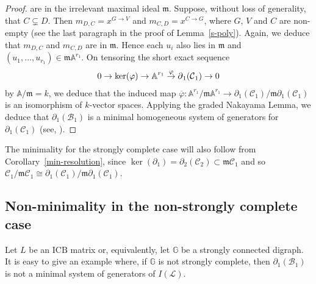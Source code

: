 \documentclass[ALCO]{cedram}
\newcommand{\mba}{\mbox{$\mathbb{A}$}}
\newcommand{\mbg}{\mbox{$\mathbb{G}$}}
\newcommand{\mcb}{\mbox{$\mathcal{B}$}}
\newcommand{\mcc}{\mbox{$\mathcal{C}$}}
\newcommand{\mcl}{\mbox{$\mathcal{L}$}}
\newcommand{\icb}{\mbox{$\mathrm{ICB}$}}
\newcommand{\mfm}{\mbox{$\mathfrak{m}$}}
\newcommand{\dif}{\mbox{$\partial$}}
\begin{document}
\begin{proof}
are in the irrelevant maximal ideal $\mfm$. Suppose, without loss of
generality, that $C\subsetneq D$. Then $m_{D,C}=x^{G\to V}$ and
$m_{C,D}=x^{C\to G}$, where $G$, $V$ and $C$ are non-empty (see the
last paragraph in the proof of Lemma~\ref{s-poly}). Again, we deduce
that $m_{D,C}$ and $m_{C,D}$ are in $\mfm$. Hence each $u_i$ also lies
in $\mfm$ and $(u_1,\ldots ,u_{r_1})\in\mfm\mba^{r_1}$. On tensoring
the short exact sequence
\begin{eqnarray*}
0\to\ker(\varphi)\to\mba^{r_1}\buildrel{\varphi}\over{\to}\dif_1(\mcc_1)\to
0 
\end{eqnarray*}
by $\mba/\mfm=k$, we deduce that the induced map
$\overline{\varphi}:\mba^{r_1}/\mfm\mba^{r_1}
\to\dif_1(\mcc_1)/\mfm\dif_1(\mcc_1)$ is an isomorphism of $k$-vector
spaces. Applying the graded Nakayama Lemma, we deduce that
$\dif_1(\mcb_1)$ is a minimal homogeneous system of generators for
$\dif_1(\mcc_1)$ (see, \eg \cite[Exercise~1.5.24]{bh}).
\end{proof}

\begin{remark}
The minimality for the strongly complete case will also follow from
Corollary~\ref{min-resolution}, since
$\ker(\dif_1)=\dif_2(\mcc_2)\subset\mfm\mcc_1$ and so
$\mcc_1/\mfm\mcc_1\cong\dif_1(\mcc_1)/\mfm\dif_1(\mcc_1)$.
\end{remark}

\subsection{Non-minimality in the non-strongly complete case}

 Let $L$ be an $\icb$ matrix or, equivalently, let $\mbg$ be
a strongly connected digraph. It is easy to give an example where, if
$\mbg$ is not strongly complete, then $\dif_1(\mcb_1)$ is not a
minimal system of generators of $I(\mcl)$.
\end{document}
